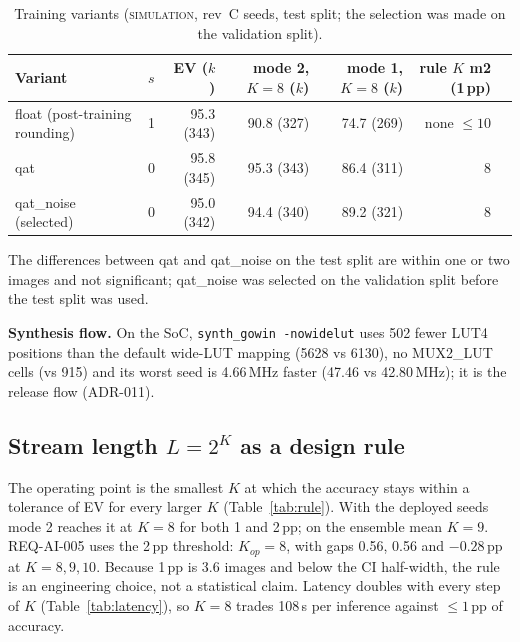 \documentclass[10pt,a4paper]{article}
\newcommand{\lbl}[1]{\textsc{#1}}          %
\begin{document}
\begin{table}[htbp]
\centering\small
\caption{Training variants (\lbl{simulation}, rev~C seeds, test split; the
selection was made on the validation split).}\label{tab:var-train}
\begin{tabular}{@{}llrrrrr@{}}
\toprule
Variant & $s$ & EV ($k$) & mode 2, $K=8$ ($k$) & mode 1, $K=8$ ($k$) & rule $K$ m2 (1\,pp)\\
\midrule
float (post-training rounding) & 1 & 95.3 (343) & 90.8 (327) & 74.7 (269) & none $\le10$\\
qat & 0 & 95.8 (345) & 95.3 (343) & 86.4 (311) & 8\\
qat\_noise (selected) & 0 & 95.0 (342) & 94.4 (340) & 89.2 (321) & 8\\
\bottomrule
\end{tabular}
\end{table}
The differences between qat and qat\_noise on the test split are within one
or two images and not significant; qat\_noise was selected on the validation
split before the test split was used.

\textbf{Synthesis flow.} On the SoC, \texttt{synth\_gowin -nowidelut} uses 502
fewer LUT4 positions than the default wide-LUT mapping (5628 vs 6130), no
MUX2\_LUT cells (vs 915) and its worst seed is 4.66\,MHz faster (47.46 vs
42.80\,MHz); it is the release flow (ADR-011).

\subsection{\texorpdfstring{Stream length $L=2^K$ as a design rule}{Stream length L = 2\textasciicircum K as a design rule}}
The operating point is the smallest $K$ at which the accuracy stays within a
tolerance of EV for every larger $K$ (Table~\ref{tab:rule}). With the
deployed seeds mode 2 reaches it at $K=8$ for both 1 and 2\,pp; on the
ensemble mean $K=9$. REQ-AI-005 uses the 2\,pp threshold: $K_{op}=8$, with
gaps 0.56, 0.56 and $-0.28$\,pp at $K=8,9,10$. Because 1\,pp is 3.6 images and
below the CI half-width, the rule is an engineering choice, not a statistical
claim. Latency doubles with every step of $K$ (Table~\ref{tab:latency}), so
$K=8$ trades 108\,\textmu s per inference against $\le1$\,pp of accuracy.
\end{document}
